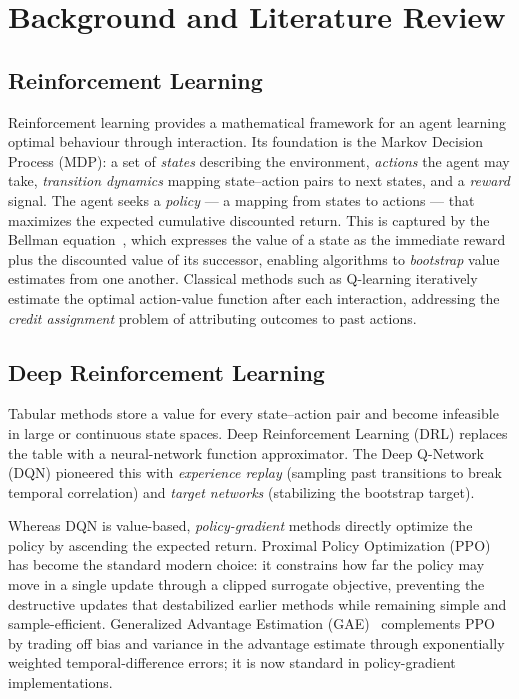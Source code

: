 \chapter{Background and Literature Review}
\label{ch:background}

\section{Reinforcement Learning}
Reinforcement learning provides a mathematical framework for an agent learning
optimal behaviour through interaction. Its foundation is the Markov Decision
Process (MDP): a set of \emph{states} describing the environment, \emph{actions}
the agent may take, \emph{transition dynamics} mapping state--action pairs to next
states, and a \emph{reward} signal. The agent seeks a \emph{policy} --- a mapping
from states to actions --- that maximizes the expected cumulative discounted
return. This is captured by the Bellman equation~\cite{sutton2018}, which expresses
the value of a state as the immediate reward plus the discounted value of its
successor, enabling algorithms to \emph{bootstrap} value estimates from one another.
Classical methods such as Q-learning iteratively estimate the optimal action-value
function after each interaction, addressing the \emph{credit assignment} problem of
attributing outcomes to past actions.

\section{Deep Reinforcement Learning}
Tabular methods store a value for every state--action pair and become infeasible in
large or continuous state spaces. Deep Reinforcement Learning (DRL) replaces the
table with a neural-network function approximator. The Deep Q-Network (DQN)
pioneered this with \emph{experience replay} (sampling past transitions to break
temporal correlation) and \emph{target networks} (stabilizing the bootstrap target).

Whereas DQN is value-based, \emph{policy-gradient} methods directly optimize the
policy by ascending the expected return. Proximal Policy Optimization
(PPO)~\cite{schulman2017ppo} has become the standard modern choice: it constrains
how far the policy may move in a single update through a clipped surrogate
objective, preventing the destructive updates that destabilized earlier methods
while remaining simple and sample-efficient. Generalized Advantage Estimation
(GAE)~\cite{schulman2016gae} complements PPO by trading off bias and variance in
the advantage estimate through exponentially weighted temporal-difference errors;
it is now standard in policy-gradient implementations.

